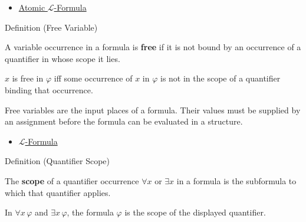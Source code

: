 \begin{dependencies}
\begin{itemize}
  \item \hyperref[def:l-atomic-formula]{Atomic $\mathcal{L}$-Formula}
\end{itemize}
\end{dependencies}

\begin{definitionbox}{Definition (Free Variable)}
\begin{definition}\label{def:free-variable}
A variable occurrence in a formula is \textbf{free} if it is not bound by an
occurrence of a quantifier in whose scope it lies.
\end{definition}
\end{definitionbox}

\begin{remark*}
$x$ is free in $\varphi$ iff some occurrence of $x$ in $\varphi$ is not in the
scope of a quantifier binding that occurrence.
\end{remark*}

\begin{remark*}[Interpretation]
Free variables are the input places of a formula. Their values must be supplied
by an assignment before the formula can be evaluated in a structure.
\end{remark*}

\begin{dependencies}
\begin{itemize}
  \item \hyperref[def:l-formula]{$\mathcal{L}$-Formula}
\end{itemize}
\end{dependencies}

\begin{definitionbox}{Definition (Quantifier Scope)}
\begin{definition}\label{def:l-quantifier-scope}
The \textbf{scope} of a quantifier occurrence $\forall x$ or $\exists x$ in a
formula is the subformula to which that quantifier applies.
\end{definition}
\end{definitionbox}

\begin{remark*}
In $\forall x\,\varphi$ and $\exists x\,\varphi$, the formula $\varphi$ is the
scope of the displayed quantifier.
\end{remark*}

